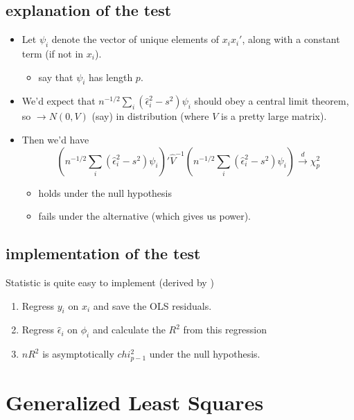 \subsection{explanation of the test}

\begin{itemize}
\item Let $\psi_i$ denote the vector of unique elements of $x_ix_i'$,
       along with a constant term (if not in $x_i$).
\begin{itemize}
\item say that $\psi_i$ has length $p$.
\end{itemize}
\item We'd expect that $n^{-1/2} \sum_i (\hat\epsilon_i^2 - s^2)
       \psi_i$ should obey a central limit theorem, so $\to N(0, V)$
       (say) in distribution (where $V$ is a pretty large matrix).
\item Then we'd have 
       \[\left(n^{-1/2} \sum_i (\hat\epsilon_i^2 - s^2)\psi_i\right)'
       \hat V^{-1} \left(n^{-1/2} \sum_i (\hat\epsilon_i^2 -
       s^2)\psi_i\right) \xrightarrow{d} \chi_p^2\]
\begin{itemize}
\item holds under the null hypothesis
\item fails under the alternative (which gives us power).
\end{itemize}
\end{itemize}

\subsection{implementation of the test}

     Statistic is quite easy to implement (derived by \citealp{Whi_1980})

\begin{enumerate}
\item Regress $y_i$ on $x_i$ and save the OLS residuals.
\item Regress $\hat\epsilon_i$ on $\phi_i$ and calculate the $R^2$
        from this regression
\item $n R^2$ is asymptotically $chi^2_{p-1}$ under the null
        hypothesis.
\end{enumerate}

\section{Generalized Least Squares}

